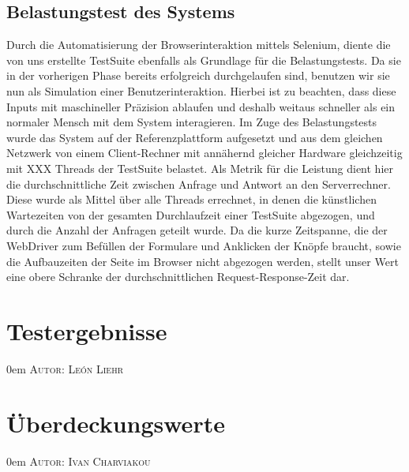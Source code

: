 \documentclass{article}
\makeatletter
\newcommand{\sectionauthor}[1]{
	{\parindent 0em \large \scshape Autor: #1 \par \nobreak \vspace*{1em}}
	\@afterheading
}
\makeatother
\begin{document}
\subsection{Belastungstest des Systems}
Durch die Automatisierung der Browserinteraktion mittels Selenium, diente die von uns erstellte TestSuite ebenfalls als Grundlage für die Belastungstests. Da sie in der vorherigen Phase bereits erfolgreich durchgelaufen sind, benutzen wir sie nun als Simulation einer Benutzerinteraktion. Hierbei ist zu beachten, dass diese Inputs mit maschineller Präzision ablaufen und deshalb weitaus schneller als ein normaler Mensch mit dem System interagieren. Im Zuge des Belastungstests wurde das System auf der Referenzplattform aufgesetzt und aus dem gleichen Netzwerk von einem Client-Rechner mit annähernd gleicher Hardware gleichzeitig mit XXX Threads der TestSuite belastet. Als Metrik für die Leistung dient hier die durchschnittliche Zeit zwischen Anfrage und Antwort an den Serverrechner. Diese wurde als Mittel über alle Threads errechnet, in denen die künstlichen Wartezeiten von der gesamten Durchlaufzeit einer TestSuite abgezogen, und durch die Anzahl der Anfragen geteilt wurde. Da die kurze Zeitspanne, die der WebDriver zum Befüllen der Formulare und Anklicken der Knöpfe braucht, sowie die Aufbauzeiten der Seite im Browser nicht abgezogen werden, stellt unser Wert eine obere Schranke der durchschnittlichen Request-Response-Zeit dar.

\newpage

\section{Testergebnisse}
\sectionauthor{León Liehr}



\newpage

\section{Überdeckungswerte}
\sectionauthor{Ivan Charviakou}



\newpage

\end{document}

